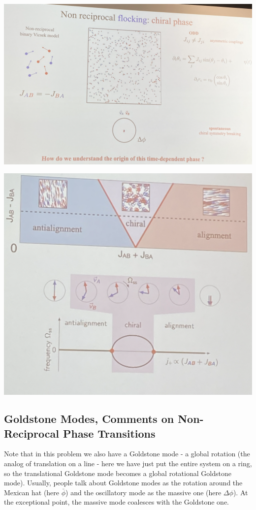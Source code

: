 \begin{center}
    \includegraphics[scale=0.3]{Lectures/Images/lec18-flocking.png}
\end{center}
\begin{center}
    \includegraphics[scale=0.35]{Lectures/Images/lec18-flockingphases.png}
\end{center}

\subsection{Goldstone Modes, Comments on Non-Reciprocal Phase Transitions}

Note that in this problem we also have a Goldstone mode - a global rotation (the analog of translation on a line - here we have just put the entire system on a ring, so the translational Goldstone mode becomes a global rotational Goldstone mode). Usually, people talk about Goldstone modes as the rotation around the Mexican hat (here $\bar{\phi}$) and the oscillatory mode as the massive one (here $\Delta \phi$). At the exceptional point, the massive mode coalesces with the Goldstone one. 

